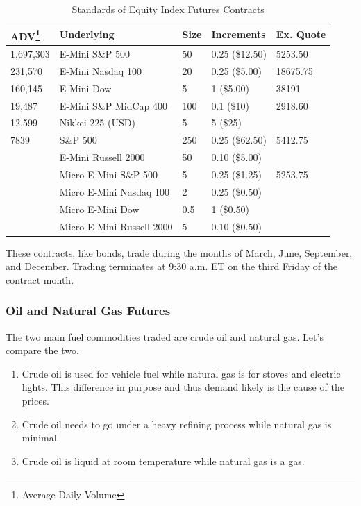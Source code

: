 \documentclass{article}
\begin{document}
      \begin{table}[H]
        \centering
        \begin{tabular}{|l|l|l|l|l|}
        \hline
        \textbf{ADV}\footnote{Average Daily Volume} & \textbf{Underlying} & \textbf{Size} & \textbf{Increments} & \textbf{Ex. Quote} \\ \hline
        1,697,303   & E-Mini S\&P 500           & 50  & 0.25 (\$12.50)  & 5253.50 \\ \hline
        231,570     & E-Mini Nasdaq 100         & 20  & 0.25 (\$5.00)   & 18675.75\\ \hline
        160,145     & E-Mini Dow                & 5   & 1 (\$5.00)      & 38191 \\ \hline 
        19,487      & E-Mini S\&P MidCap 400    & 100 & 0.1 (\$10)      & 2918.60 \\ \hline
        12,599      & Nikkei 225 (USD)          & 5   & 5 (\$25)        & \\ \hline
        7839        & S\&P 500                  & 250 & 0.25 (\$62.50)  & 5412.75 \\ \hline
                    & E-Mini Russell 2000       & 50  & 0.10 (\$5.00)   & \\ \hline
                    & Micro E-Mini S\&P 500     & 5   & 0.25 (\$1.25)   & 5253.75 \\ \hline
                    & Micro E-Mini Nasdaq 100   & 2   & 0.25 (\$0.50)   & \\ \hline
                    & Micro E-Mini Dow          & 0.5 & 1 (\$0.50)      & \\ \hline
                    & Micro E-Mini Russell 2000 & 5   & 0.10 (\$0.50)   & \\ \hline
        \end{tabular}
        \caption{Standards of Equity Index Futures Contracts}
        \label{tab:equity_index}
      \end{table}

      These contracts, like bonds, trade during the months of March, June, September, and December. Trading terminates at 9:30 a.m. ET on the third Friday of the contract month.

    \subsubsection{Oil and Natural Gas Futures}

      The two main fuel commodities traded are crude oil and natural gas. Let's compare the two. 
      \begin{enumerate}
        \item Crude oil is used for vehicle fuel while natural gas is for stoves and electric lights. This difference in purpose and thus demand likely is the cause of the prices.  
        \item Crude oil needs to go under a heavy refining process while natural gas is minimal. 
        \item Crude oil is liquid at room temperature while natural gas is a gas. 
      \end{enumerate}
\end{document}
